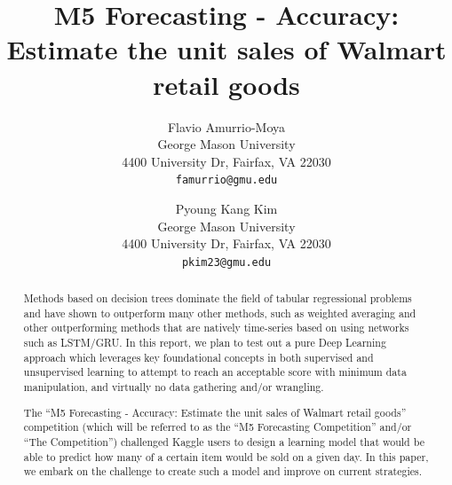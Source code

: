 \documentclass[10pt,twocolumn,letterpaper]{article}
\begin{document}
\title{M5 Forecasting - Accuracy: Estimate the unit sales of Walmart retail goods}

\author{Flavio Amurrio-Moya\\
George Mason University\\
4400 University Dr, Fairfax, VA 22030\\
{\tt\small famurrio@gmu.edu}
\and
Pyoung Kang Kim\\
George Mason University\\
4400 University Dr, Fairfax, VA 22030\\
{\tt\small pkim23@gmu.edu}
}


\maketitle
\thispagestyle{empty}

\begin{abstract}
  Methods based on decision trees dominate the field of tabular regressional
  problems and have shown to outperform many other methods, such as weighted
  averaging and other outperforming methods that are natively time-series based
  on using networks such as LSTM/GRU. In this report, we plan to test out a pure
  Deep Learning approach which leverages key foundational concepts in both
  supervised and unsupervised learning to attempt to reach an acceptable score
  with minimum data manipulation, and virtually no data gathering and/or
  wrangling.

  The ``M5 Forecasting - Accuracy: Estimate the unit sales of Walmart retail
  goods'' competition (which will be referred to as the ``M5 Forecasting
  Competition'' and/or ``The Competition'') challenged Kaggle users to design a
  learning model that would be able to predict how many of a certain item would
  be sold on a given day. In this paper, we embark on the challenge to create
  such a model and improve on current strategies.

\end{abstract}
\end{document}
